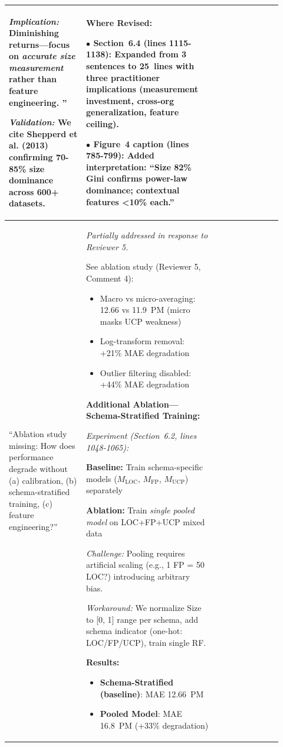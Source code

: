 \documentclass[11pt,a4paper]{article}
\begin{document}
\begin{longtable}{>{\raggedright\arraybackslash}p{0.26\linewidth}|>{\raggedright\arraybackslash}p{0.44\linewidth}|>{\raggedright\arraybackslash}p{0.22\linewidth}}
\textit{Implication:} Diminishing returns---focus on \textit{accurate size measurement} rather than feature engineering. ''

\textit{Validation:} We cite Shepperd et al. (2013) confirming 70-85\% size dominance across 600+ datasets. &

\textbf{Where Revised:}

$\bullet$ \textbf{Section~6.4} (lines 1115-1138): Expanded from 3 sentences to 25~lines with three practitioner implications (measurement investment, cross-org generalization, feature ceiling).

$\bullet$ \textbf{Figure~4 caption} (lines 785-799): Added interpretation: ``Size 82\% Gini confirms power-law dominance; contextual features <10\% each.'' \\

\midrule

``Ablation study missing: How does performance degrade without (a) calibration, (b) schema-stratified training, (c) feature engineering?'' &

\textit{Partially addressed in response to Reviewer 5.}

See ablation study (Reviewer 5, Comment 4):
\begin{itemize}
    \item Macro vs micro-averaging: 12.66 vs 11.9~PM (micro masks UCP weakness)
    \item Log-transform removal: +21\% MAE degradation
    \item Outlier filtering disabled: +44\% MAE degradation
\end{itemize}

\textbf{Additional Ablation---Schema-Stratified Training:}

\textit{Experiment (Section~6.2, lines 1048-1065):}

\textbf{Baseline:} Train schema-specific models ($M_{\text{LOC}}$, $M_{\text{FP}}$, $M_{\text{UCP}}$) separately

\textbf{Ablation:} Train \textit{single pooled model} on LOC+FP+UCP mixed data

\textit{Challenge:} Pooling requires artificial scaling (e.g., 1 FP = 50 LOC?) introducing arbitrary bias.

\textit{Workaround:} We normalize Size to [0, 1] range per schema, add schema indicator (one-hot: LOC/FP/UCP), train single RF.

\textbf{Results:}
\begin{itemize}
    \item \textbf{Schema-Stratified (baseline)}: MAE 12.66~PM
    \item \textbf{Pooled Model}: MAE 16.8~PM (+33\% degradation)
\end{itemize}


\end{longtable}
\end{document}
